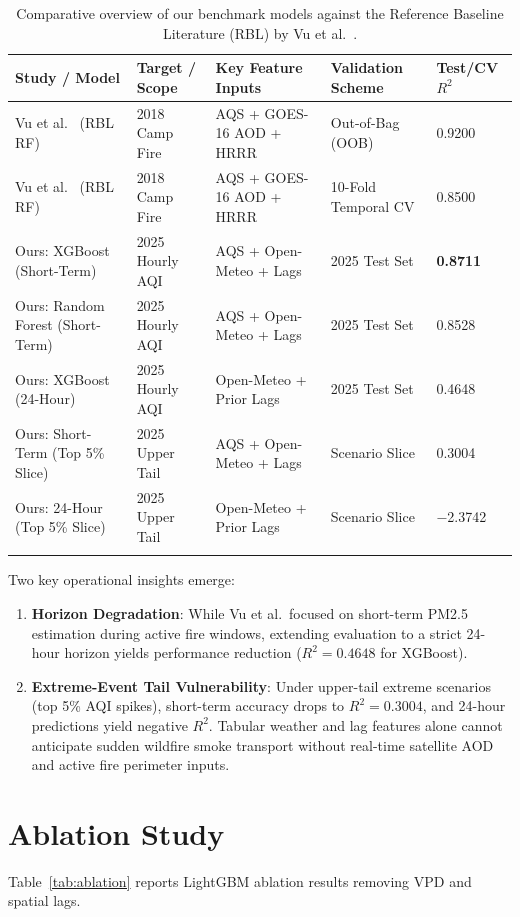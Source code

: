 \documentclass[pdflatex,sn-mathphys-num]{sn-jnl}
\begin{document}
\begin{table}[htbp]
\caption{Comparative overview of our benchmark models against the Reference Baseline Literature (RBL) by Vu et al.~\cite{vu2022geostationary}.}\label{tab:rbl-comparison}
\footnotesize
\setlength{\tabcolsep}{2pt}
\begin{tabular*}{\textwidth}{@{\extracolsep\fill}lllll}
\toprule
Study / Model & Target / Scope & Key Feature Inputs & Validation Scheme & Test/CV $R^2$ \\
\midrule
Vu et al.~\cite{vu2022geostationary} (RBL RF) & 2018 Camp Fire & AQS + GOES-16 AOD + HRRR & Out-of-Bag (OOB) & 0.9200 \\
Vu et al.~\cite{vu2022geostationary} (RBL RF) & 2018 Camp Fire & AQS + GOES-16 AOD + HRRR & 10-Fold Temporal CV & 0.8500 \\
\midrule
Ours: XGBoost (Short-Term) & 2025 Hourly AQI & AQS + Open-Meteo + Lags & 2025 Test Set & \textbf{0.8711} \\
Ours: Random Forest (Short-Term) & 2025 Hourly AQI & AQS + Open-Meteo + Lags & 2025 Test Set & 0.8528 \\
Ours: XGBoost (24-Hour) & 2025 Hourly AQI & Open-Meteo + Prior Lags & 2025 Test Set & 0.4648 \\
Ours: Short-Term (Top 5\% Slice) & 2025 Upper Tail & AQS + Open-Meteo + Lags & Scenario Slice & 0.3004 \\
Ours: 24-Hour (Top 5\% Slice) & 2025 Upper Tail & Open-Meteo + Prior Lags & Scenario Slice & $-$2.3742 \\
\botrule
\end{tabular*}
\end{table}

Two key operational insights emerge:
\begin{enumerate}
    \item \textbf{Horizon Degradation}: While Vu et al.\ focused on short-term PM2.5 estimation during active fire windows, extending evaluation to a strict 24-hour horizon yields performance reduction ($R^2 = 0.4648$ for XGBoost).
    \item \textbf{Extreme-Event Tail Vulnerability}: Under upper-tail extreme scenarios (top 5\% AQI spikes), short-term accuracy drops to $R^2 = 0.3004$, and 24-hour predictions yield negative $R^2$. Tabular weather and lag features alone cannot anticipate sudden wildfire smoke transport without real-time satellite AOD and active fire perimeter inputs.
\end{enumerate}

\section{Ablation Study}\label{sec:ablation}
Table~\ref{tab:ablation} reports LightGBM ablation results removing VPD and spatial lags.
\end{document}
